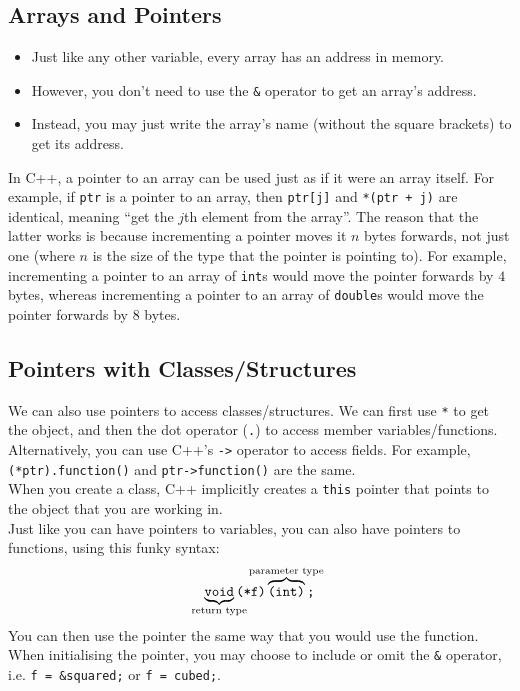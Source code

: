 \documentclass[class=article, crop=false]{standalone}
\begin{document}
  \subsection{Arrays and Pointers}
  \begin{itemize}
    \item Just like any other variable, every array has an address in memory.
    \item However, you don't need to use the \texttt{\&} operator to get an array's address.
    \item Instead, you may just write the array's name (without the square brackets) to get its address.
  \end{itemize}
  In C++, a pointer to an array can be used just as if it were an array itself. For example, if \texttt{ptr} is a pointer to an array, then \texttt{ptr[j]} and \texttt{*(ptr + j)} are identical, meaning ``get the $j$th element from the array''. The reason that the latter works is because incrementing a pointer moves it $n$ bytes forwards, not just one (where $n$ is the size of the type that the pointer is pointing to). For example, incrementing a pointer to an array of \texttt{int}s would move the pointer forwards by $4$ bytes, whereas incrementing a pointer to an array of \texttt{double}s would move the pointer forwards by $8$ bytes.
  \subsection{Pointers with Classes/Structures}
  We can also use pointers to access classes/structures. We can first use \texttt{*} to get the object, and then the dot operator (\texttt{.}) to access member variables/functions. Alternatively, you can use C++'s \texttt{->} operator to access fields. For example, \texttt{(*ptr).function()} and \texttt{ptr->function()} are the same. \\[10pt]
  When you create a class, C++ implicitly creates a \texttt{this} pointer that points to the object that you are working in. \\[10pt]
  Just like you can have pointers to variables, you can also have pointers to functions, using this funky syntax:
  \[
    \underbrace{\texttt{void}}_{\mathclap{\text{return type}}}\texttt{(*f)}\overbrace{\texttt{(int)}}^{\mathclap{\text{parameter type}}}\texttt{;}
  \]
  You can then use the pointer the same way that you would use the function. When initialising the pointer, you may choose to include or omit the \texttt{\&} operator, i.e. \texttt{f = \&squared;} or \texttt{f = cubed;}.
\end{document}
